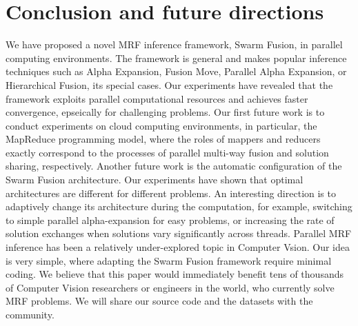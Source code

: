 \section{Conclusion and future directions}
We have proposed a novel MRF inference framework, Swarm Fusion, in
parallel computing environments. The framework is general and makes
popular inference techniques such as Alpha Expansion, Fusion Move,
Parallel Alpha Expansion, or Hierarchical Fusion, its special cases. Our
experiments have revealed that the framework exploits parallel
computational resources and achieves faster convergence, epseically for
challenging problems.  Our first future work is to conduct experiments
on cloud computing environments, in particular, the MapReduce
programming model, where the roles of mappers and reducers exactly
correspond to the processes of parallel multi-way fusion and solution
sharing, respectively.  Another future work is the automatic
configuration of the Swarm Fusion architecture.  Our experiments have
shown that optimal architectures are different for different problems.
An interesting direction is to adaptively change its architecture during
the computation, for example, switching to simple parallel
alpha-expansion for easy problems, or increasing the rate of solution
exchanges when solutions vary significantly across threads.
%
Parallel MRF inference has been a relatively under-explored topic in
Computer Vsion. Our idea is very simple, where adapting the Swarm Fusion
framework require minimal coding. We believe that this paper would
immediately benefit tens of thousands of Computer Vision researchers or
engineers in the world, who currently solve MRF problems. We will share
our source code and the datasets with the community.
